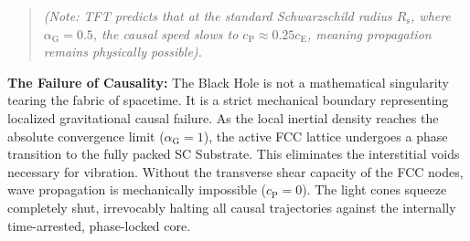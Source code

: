 \begin{quote}
    \textit{(Note: TFT predicts that at the standard Schwarzschild radius $R_{\mathrm{s}}$, where $\alpha_{\mathrm{G}} = 0.5$, the causal speed slows to $c_{\mathrm{P}} \approx 0.25c_{\mathrm{E}}$, meaning propagation remains physically possible).}
\end{quote}

\vspace{0.5em}
\noindent\textbf{The Failure of Causality:} The Black Hole is not a mathematical singularity tearing the fabric of spacetime. It is a strict mechanical boundary representing localized gravitational causal failure. As the local inertial density reaches the absolute convergence limit ($\alpha_{\mathrm{G}} = 1$), the active FCC lattice undergoes a phase transition to the fully packed SC Substrate. This eliminates the interstitial voids necessary for vibration. Without the transverse shear capacity of the FCC nodes, wave propagation is mechanically impossible ($c_{\mathrm{P}} = 0$). The light cones squeeze completely shut, irrevocably halting all causal trajectories against the internally time-arrested, phase-locked core.
